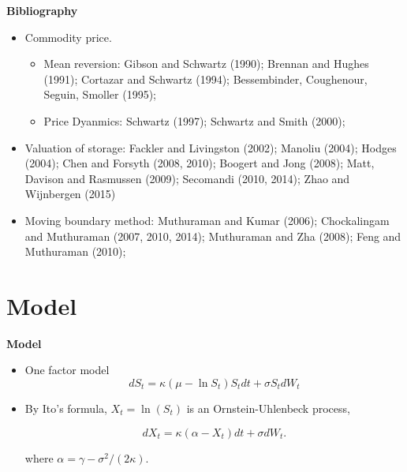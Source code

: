 \documentclass{beamer}
\begin{document}
\begin{frame}
{\bf Bibliography}

\begin{itemize}
  \item Commodity price.
      \begin{itemize}
      \item Mean reversion:  Gibson and Schwartz (1990); Brennan and Hughes (1991); Cortazar and Schwartz (1994); Bessembinder, Coughenour, Seguin, Smoller (1995);
      \item Price Dyanmics: Schwartz (1997); Schwartz and Smith (2000);
      \end{itemize}
  \item Valuation of storage: \small{Fackler and Livingston (2002); Manoliu (2004); Hodges (2004); Chen and Forsyth (2008, 2010); Boogert and Jong (2008); Matt, Davison and Rasmussen (2009); Secomandi (2010, 2014); Zhao and Wijnbergen (2015)	}
  
  \item Moving boundary method: \small{Muthuraman and Kumar (2006); Chockalingam and Muthuraman (2007, 2010, 2014); Muthuraman and Zha (2008); Feng and Muthuraman (2010); }
\end{itemize}

\end{frame}


\section{Model}
\begin{frame}
{\bf Model}
\begin{itemize}
  \item One factor model
\begin{equation*}
  dS_t = \kappa ( \mu - \ln S_t)S_t dt + \sigma S_t dW_t
\end{equation*}
\item By Ito's formula, $X_t = \ln(S_t)$ is an Ornstein-Uhlenbeck process,

\begin{equation*}
  dX_t = \kappa ( \alpha - X_t) dt + \sigma dW_t.
\end{equation*}

where $\alpha  = \gamma - \sigma^2/(2\kappa)$.
\end{itemize}

\end{frame}
\end{document}
